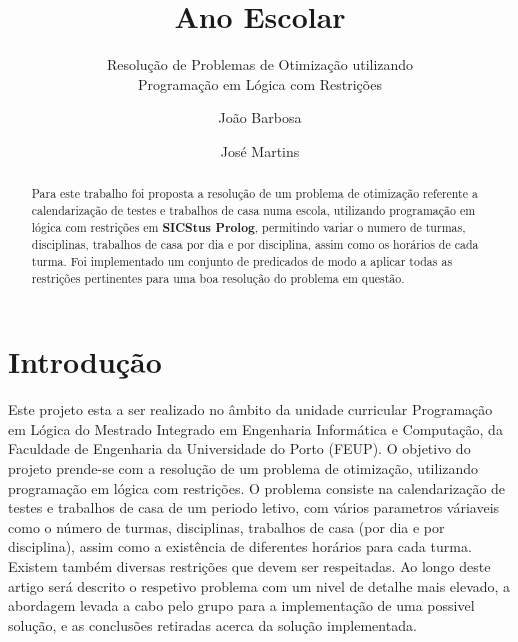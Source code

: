 \documentclass{llncs}
\begin{document}
%
\frontmatter          %
%
\pagestyle{headings}  %
%
\title{Ano Escolar}
\subtitle{Resolução de Problemas de Otimização utilizando\\
Programação em Lógica com Restrições}
%
%
\author{João Barbosa \and José Martins}
%
%

\maketitle              %

\begin{abstract} %

Para este trabalho foi proposta a resolução de um problema de otimização referente a calendarização de testes e trabalhos de casa numa escola, utilizando programação em lógica com restrições em \textbf{SICStus Prolog}, permitindo variar o numero de turmas, disciplinas, trabalhos de casa por dia e por disciplina, assim como os horários de cada turma.
Foi implementado um conjunto de predicados de modo a aplicar todas as restrições pertinentes para uma boa resolução do problema em questão.

\end{abstract}
%
\section{Introdução}
%
Este projeto esta a ser realizado no âmbito da unidade curricular Programação em Lógica do Mestrado Integrado em Engenharia Informática e Computação, da Faculdade de Engenharia da Universidade do Porto (FEUP).
O objetivo do projeto prende-se com a resolução de um problema de otimização, utilizando programação em lógica com restrições.
O problema consiste na calendarização de testes e trabalhos de casa de um periodo letivo, com vários parametros váriaveis como o número de turmas, disciplinas, trabalhos de casa (por dia e por disciplina), assim como a existência de diferentes horários para cada turma. Existem também diversas restrições que devem ser respeitadas.
Ao longo deste artigo será descrito o respetivo problema com um nivel de detalhe mais elevado, a abordagem levada a cabo pelo grupo para a implementação de uma possivel solução, e as conclusões retiradas acerca da solução implementada.
\end{document}
